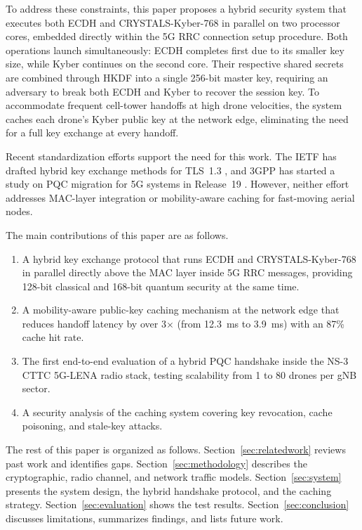 \documentclass{ieeeaccess}
\begin{document}
To address these constraints, this paper proposes a hybrid security system that executes both ECDH and CRYSTALS-Kyber-768 in parallel on two processor cores, embedded directly within the 5G RRC connection setup procedure. Both operations launch simultaneously: ECDH completes first due to its smaller key size, while Kyber continues on the second core. Their respective shared secrets are combined through HKDF into a single 256-bit master key, requiring an adversary to break both ECDH and Kyber to recover the session key. To accommodate frequent cell-tower handoffs at high drone velocities, the system caches each drone's Kyber public key at the network edge, eliminating the need for a full key exchange at every handoff.

Recent standardization efforts support the need for this work. The IETF has drafted hybrid key exchange methods for TLS~1.3 \cite{ref27}, and 3GPP has started a study on PQC migration for 5G systems in Release~19 \cite{ref28}. However, neither effort addresses MAC-layer integration or mobility-aware caching for fast-moving aerial nodes.

The main contributions of this paper are as follows.
\begin{enumerate}
\item A hybrid key exchange protocol that runs ECDH and CRYSTALS-Kyber-768 in parallel directly above the MAC layer inside 5G RRC messages, providing 128-bit classical and 168-bit quantum security at the same time.
\item A mobility-aware public-key caching mechanism at the network edge that reduces handoff latency by over 3$\times$ (from 12.3~ms to 3.9~ms) with an 87\% cache hit rate.
\item The first end-to-end evaluation of a hybrid PQC handshake inside the NS-3 CTTC 5G-LENA radio stack, testing scalability from 1 to 80 drones per gNB sector.
\item A security analysis of the caching system covering key revocation, cache poisoning, and stale-key attacks.
\end{enumerate}

The rest of this paper is organized as follows. Section~\ref{sec:relatedwork} reviews past work and identifies gaps. Section~\ref{sec:methodology} describes the cryptographic, radio channel, and network traffic models. Section~\ref{sec:system} presents the system design, the hybrid handshake protocol, and the caching strategy. Section~\ref{sec:evaluation} shows the test results. Section~\ref{sec:conclusion} discusses limitations, summarizes findings, and lists future work.
\end{document}
